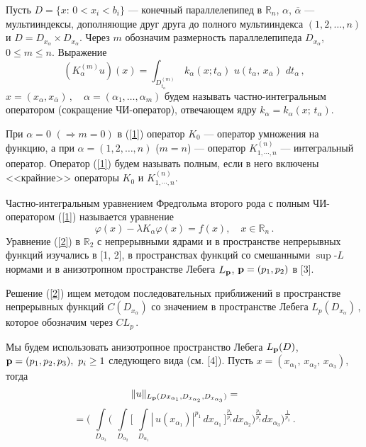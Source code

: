 
\vzmscaption

Пусть $D=\{x:\,0<x_i<b_i\}$ --- конечный параллелепипед в $\mathbb{R}_n$, $\alpha$, ${\overline\alpha}$ --- мультииндексы, дополняющие друг друга до полного мультииндекса $(1,2,\ldots,n)$ и $D=D_{x_\alpha}\times D_{x_{\overline\alpha}}$. Через $m$ обозначим размерность
параллелепипеда $D_{x_\alpha}$, $0\leq m\leq n$. Выражение
\begin{equation}\label{1}
(K^{(m)}_{\alpha} u)(x)=\int_{D^{(m)}_{t_\alpha}} \,k_{\alpha}(x;t_\alpha) \,\,u(t_\alpha,
\,x_{\overline{\alpha}})\,\,dt_\alpha\,,
\end{equation}
$
x=(x_\alpha,x_{\overline\alpha})\,,\quad
\alpha=(\alpha_1,\ldots,\alpha_m)$
будем называть частно-интегральным оператором (сокращение ЧИ-оператор), отвечающем ядру $k_{\alpha}=k_{\alpha}(x;\, t_\alpha)$.

При $\alpha=0$ $(\Rightarrow m=0)$ в (\ref{1}) оператор $K_0$ --- оператор умножения на функцию, а при $\alpha=(1,2,\ldots,n)$ ($m=n$) --- оператор $K_{1,\cdots,n}^{(n)}$ --- интегральный оператор.
Оператор (\ref{1}) будем называть полным, если в него включены <<крайние>> операторы $K_0$ и $K_{1,\cdots,n}^{(n)}$.

Частно-интегральным уравнением Фредгольма второго рода с полным ЧИ-оператором (\ref{1}) называется уравнение
 \begin{equation}\label{2}
\varphi(x)-\lambda K_{\alpha}\varphi(x)=f(x), \quad x\in\mathbb{R}_n\,.
\end{equation}
Уравнение (\ref{2}) в $\mathbb{R}_2$ с непрерывными ядрами и в пространстве непрерывных функций  изучались в [1, 2], в пространствах функций со смешанными $\sup$-$L$ нормами и в анизотропном пространстве Лебега $L_{\bf p}$, ${\bf p}=(p_1,p_2)$ в [3].

Решение (\ref{2}) ищем методом последовательных приближений в пространстве непрерывных функций  $C(D_{x_{\overline\alpha}})$ со значением в пространстве Лебега
$ L_p(D_{x_{\alpha}})$\,, которое обозначим через $CL_p$\,.

Мы будем использовать анизотропное пространство Лебега $L_{\bf p}(D)$, ${\bf p}=(p_1,p_2,p_3),~p_i\geq 1$ следующего вида (см. [4]). Пусть $x=(x_{\alpha_1},\,x_{\alpha_2},\,x_{\alpha_3})$, тогда
$$
\|u\|_{L_{\bf p}(D{x_{\alpha_1},D_{x_{\alpha_2}},
D_{x_{\alpha_3}})}}=
$$
$$
=\Biggl(\,\, \int\limits_{D_{\alpha_3}} \Biggl(\,\, \int\limits_{D_{\alpha_2}}\biggl[\,\,
\int\limits_{D_{\alpha_1}} |\,u(x_{\alpha_1})|^{p_1} \,dx_{\alpha_1} \,\biggr]^\frac{p_2}{p_1} dx_{\alpha_2}\Biggr)^{\frac{p_3}{p_{2}}} dx_{\alpha_3}\Biggr)^{\frac{1}{p_3}} \,.
$$

